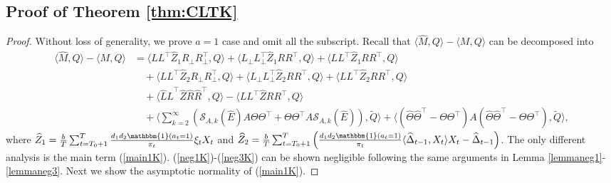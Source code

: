 \documentclass[12pt]{article}
\newcommand{\inp}[2]{\langle #1,#2\rangle}
\theoremstyle{plain}
\begin{document}
\subsection{Proof of Theorem \ref{thm:CLTK}}\label{sec:proofCLTK}
\begin{proof}
    Without loss of generality, we prove $a=1$ case and omit all the subscript. Recall that $\inp{\widehat{M}}{Q}-\inp{M}{Q}$ can be decomposed into
    \begin{align}
    \inp{\widehat{M}}{Q}-\inp{M}{Q}&= \inp{LL^{\top}\widehat{Z}_1R_{\perp}R_{\perp}^{\top}}{Q} + \inp{L_{\perp}L_{\perp}^{\top}\widehat{Z}_1RR^{\top}}{Q} + \inp{LL^{\top}\widehat{Z}_1RR^{\top}}{Q} \label{main1K} \\ &\quad + \inp{LL^{\top}\widehat{Z}_2R_{\perp}R_{\perp}^{\top}}{Q} + \inp{L_{\perp}L_{\perp}^{\top}\widehat{Z}_2RR^{\top}}{Q} + \inp{LL^{\top}\widehat{Z}_2RR^{\top}}{Q}\label{neg1K} \\ &\quad + \inp{\widehat{L}\widehat{L}^{\top}\widehat{Z}\widehat{R}\widehat{R}^{\top}}{Q} - \inp{LL^{\top}\widehat{Z}RR^{\top}}{Q} \label{neg2K} \\ &\quad + \inp{\sum_{k=2}^{\infty} (\mathcal{S}_{A,k}(\widehat{E})A\Theta\Theta^{\top}+\Theta\Theta^{\top}A\mathcal{S}_{A,k}(\widehat{E}))}{\widetilde{Q}} + \inp{(\widehat{\Theta}\widehat{\Theta}^{\top}-\Theta\Theta^{\top})A(\widehat{\Theta}\widehat{\Theta}^{\top}-\Theta\Theta^{\top})}{\widetilde{Q}}, \label{neg3K}
\end{align}
    where $\widehat{Z}_1=\frac{b}{T}\sum_{t=T_0+1}^T \frac{d_1d_2\mathbbm{1}(a_t=1)}{\pi_t}\xi_tX_t$ and $\widehat{Z}_2=\frac{b}{T}\sum_{t=T_0+1}^{T} \left(\frac{d_1d_2\mathbbm{1}(a_t=1)}{\pi_t}\inp{\widehat{\Delta}_{t-1}}{X_t}X_t-\widehat{\Delta}_{t-1}\right)$. The only different analysis is the main term (\ref{main1K}). (\ref{neg1K})-(\ref{neg3K}) can be shown negligible following the same arguments in Lemma \ref{lemmaneg1}-\ref{lemmaneg3}. Next we show the asymptotic normality of (\ref{main1K}).
    

\end{proof}
\end{document}
